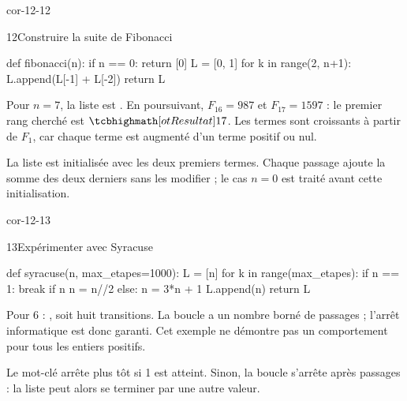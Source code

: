 \begin{blocLivre}{cor-12-12}
\begin{corrige}{12}{Construire la suite de Fibonacci}
\begin{python}
def fibonacci(n):
    if n == 0:
        return [0]
    L = [0, 1]
    for k in range(2, n+1):
        L.append(L[-1] + L[-2])
    return L
\end{python}
Pour $n=7$, la liste est \code{[0, 1, 1, 2, 3, 5, 8, 13]}.
En poursuivant, $F_{16}=987$ et $F_{17}=1597$ : le premier rang cherché est $\res{17}$.
Les termes sont croissants à partir de $F_1$, car chaque terme est augmenté d'un terme positif ou nul.

La liste est initialisée avec les deux premiers termes. Chaque passage ajoute la somme des deux derniers sans les modifier ; le cas $n=0$ est traité avant cette initialisation.

\end{corrige}
\end{blocLivre}
\begin{blocLivre}{cor-12-13}
\begin{corrige}{13}{Expérimenter avec Syracuse}
\begin{python}
def syracuse(n, max_etapes=1000):
    L = [n]
    for k in range(max_etapes):
        if n == 1:
            break
        if n %
            n = n//2
        else:
            n = 3*n + 1
        L.append(n)
    return L
\end{python}
Pour 6 : \code{[6, 3, 10, 5, 16, 8, 4, 2, 1]}, soit huit transitions.
La boucle  a un nombre borné de passages ; l'arrêt informatique est donc garanti.
Cet exemple ne démontre pas un comportement pour tous les entiers positifs.

Le mot-clé  arrête plus tôt si 1 est atteint. Sinon, la boucle s’arrête après  passages : la liste peut alors se terminer par une autre valeur.

\end{corrige}
\end{blocLivre}
